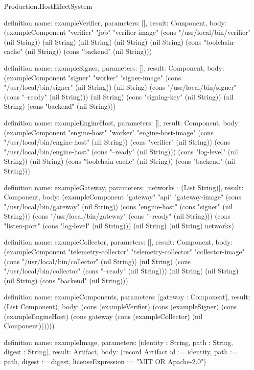 \begin{lexlean}{Production.HostEffectSystem}
\begin{semanticmodule}
definition{
  name: exampleVerifier,
  parameters: [],
  result: Component,
  body: (exampleComponent "verifier" "job" "verifier-image" (cons "/usr/local/bin/verifier" (nil String)) (nil String) (nil String) (nil String) (nil String) (cons "toolchain-cache" (nil String)) (cons "backend" (nil String)))
}

definition{
  name: exampleSigner,
  parameters: [],
  result: Component,
  body: (exampleComponent "signer" "worker" "signer-image" (cons "/usr/local/bin/signer" (nil String)) (nil String) (cons "/usr/local/bin/signer" (cons "--ready" (nil String))) (nil String) (cons "signing-key" (nil String)) (nil String) (cons "backend" (nil String)))
}

definition{
  name: exampleEngineHost,
  parameters: [],
  result: Component,
  body: (exampleComponent "engine-host" "worker" "engine-host-image" (cons "/usr/local/bin/engine-host" (nil String)) (cons "verifier" (nil String)) (cons "/usr/local/bin/engine-host" (cons "--ready" (nil String))) (cons "log-level" (nil String)) (nil String) (cons "toolchain-cache" (nil String)) (cons "backend" (nil String)))
}

definition{
  name: exampleGateway,
  parameters: [networks : (List String)],
  result: Component,
  body: (exampleComponent "gateway" "api" "gateway-image" (cons "/usr/local/bin/gateway" (nil String)) (cons "engine-host" (cons "signer" (nil String))) (cons "/usr/local/bin/gateway" (cons "--ready" (nil String))) (cons "listen-port" (cons "log-level" (nil String))) (nil String) (nil String) networks)
}

definition{
  name: exampleCollector,
  parameters: [],
  result: Component,
  body: (exampleComponent "telemetry-collector" "telemetry-collector" "collector-image" (cons "/usr/local/bin/collector" (nil String)) (nil String) (cons "/usr/local/bin/collector" (cons "--ready" (nil String))) (nil String) (nil String) (nil String) (cons "backend" (nil String)))
}

definition{
  name: exampleComponents,
  parameters: [gateway : Component],
  result: (List Component),
  body: (cons (exampleVerifier) (cons (exampleSigner) (cons (exampleEngineHost) (cons gateway (cons (exampleCollector) (nil Component))))))
}

definition{
  name: exampleImage,
  parameters: [identity : String, path : String, digest : String],
  result: Artifact,
  body: (record Artifact {id := identity, path := path, digest := digest, licenseExpression := "MIT OR Apache-2.0"})
}


\end{semanticmodule}
\end{lexlean}

